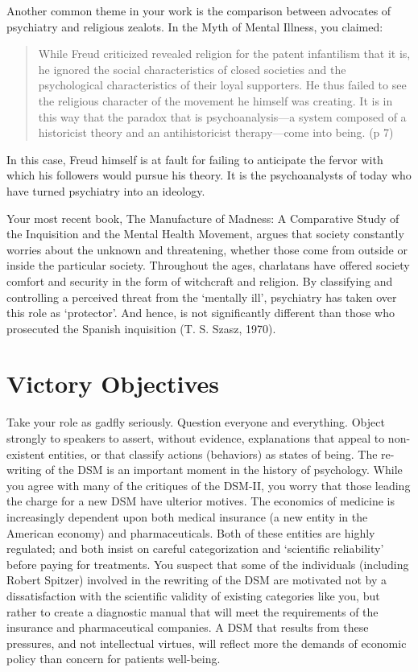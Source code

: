 Another common theme in your work is the comparison between advocates of psychiatry and religious zealots. In the Myth of Mental Illness, you claimed:

\begin{quote}

While Freud criticized revealed religion for the patent infantilism that it is, he ignored the social characteristics of closed societies and the psychological characteristics of their loyal supporters. He thus failed to see the religious character of the movement he himself was creating. It is in this way that the paradox that is psychoanalysis---a system composed of a historicist theory and an antihistoricist therapy---come into being. (p 7)
\end{quote}

In this case, Freud himself is at fault for failing to anticipate the fervor with which his followers would pursue his theory. It is the psychoanalysts of today who have turned psychiatry into an ideology.

Your most recent book, The Manufacture of Madness: A Comparative Study of the Inquisition and the Mental Health Movement, argues that society constantly worries about the unknown and threatening, whether those come from outside or inside the particular society. Throughout the ages, charlatans have offered society comfort and security in the form of witchcraft and religion. By classifying and controlling a perceived threat from the `mentally ill', psychiatry has taken over this role as `protector'. And hence, is not significantly different than those who prosecuted the Spanish inquisition (T. S. Szasz, 1970).

\section{Victory Objectives}
\label{victoryobjectives}

Take your role as gadfly seriously. Question everyone and everything. Object strongly to speakers to assert, without evidence, explanations that appeal to non-existent entities, or that classify actions (behaviors) as states of being.
The re-writing of the DSM is an important moment in the history of psychology. While you agree with many of the critiques of the DSM-II, you worry that those leading the charge for a new DSM have ulterior motives. The economics of medicine is increasingly dependent upon both medical insurance (a new entity in the American economy) and pharmaceuticals. Both of these entities are highly regulated; and both insist on careful categorization and `scientific reliability' before paying for treatments. You suspect that some of the individuals (including Robert Spitzer) involved in the rewriting of the DSM are motivated not by a dissatisfaction with the scientific validity of existing categories like you, but rather to create a diagnostic manual that will meet the requirements of the insurance and pharmaceutical companies. A DSM that results from these pressures, and not intellectual virtues, will reflect more the demands of economic policy than concern for patients well-being.

